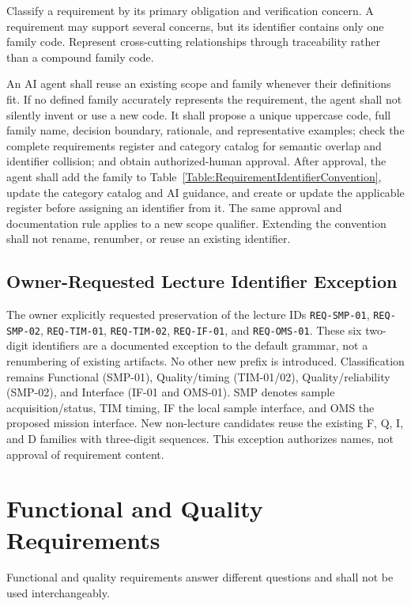 Classify a requirement by its primary obligation and verification concern. A
requirement may support several concerns, but its identifier contains only one
family code. Represent cross-cutting relationships through traceability rather
than a compound family code.

An AI agent shall reuse an existing scope and family whenever their definitions
fit. If no defined family accurately represents the requirement, the agent
shall not silently invent or use a new code. It shall propose a unique uppercase
code, full family name, decision boundary, rationale, and representative
examples; check the complete requirements register and category catalog for
semantic overlap and identifier collision; and obtain authorized-human
approval. After approval, the agent shall add the family to
Table~\ref{Table:RequirementIdentifierConvention}, update the category catalog
and AI guidance, and create or update the applicable register before assigning
an identifier from it. The same approval and documentation rule applies to a
new scope qualifier. Extending the convention shall not rename, renumber, or
reuse an existing identifier.

\subsection{Owner-Requested Lecture Identifier Exception}
\label{Section:LectureRequirementIDs}
The owner explicitly requested preservation of the lecture IDs
\texttt{REQ-SMP-01}, \texttt{REQ-SMP-02}, \texttt{REQ-TIM-01},
\texttt{REQ-TIM-02}, \texttt{REQ-IF-01}, and \texttt{REQ-OMS-01}.
These six two-digit identifiers are a documented exception to the default
grammar, not a renumbering of existing artifacts. No other new prefix is
introduced. Classification remains Functional (SMP-01), Quality/timing
(TIM-01/02), Quality/reliability (SMP-02), and Interface (IF-01 and OMS-01).
SMP denotes sample acquisition/status, TIM timing, IF the local sample
interface, and OMS the proposed mission interface. New non-lecture candidates
reuse the existing F, Q, I, and D families with three-digit sequences.
This exception authorizes names, not approval of requirement content.

\section{Functional and Quality Requirements}
Functional and quality requirements answer different questions and shall not be
used interchangeably.

